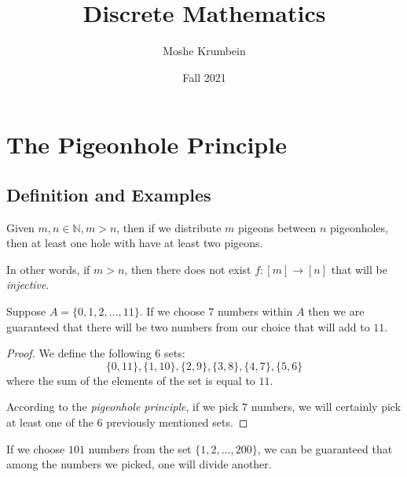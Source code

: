 \documentclass[00_complete]{subfiles}
\title{Discrete Mathematics}
\author{Moshe Krumbein}
\date{Fall 2021}
\begin{document}

\section{The Pigeonhole Principle}
\subsection{Definition and Examples}
\begin{definition}
    Given $m, n \in \mathbb{N}, m>n$, then if we distribute $m$ pigeons between
    $n$ pigeonholes, then at least one hole with have at least two pigeons.

    In other words, if $m>n$, then there does not exist $f: [m] \to [n]$ that
    will be \emph{injective}.
\end{definition}

\begin{claim}
    Suppose $A =\{0,1,2,\dots,11\}$. If we choose $7$ numbers within $A$ then
    we are guaranteed that there will be two numbers from our choice that will
    add to $11$.
\end{claim}

\begin{proof}
    We define the following $6$ sets:
    $$\{0,11\},\{1,10\}, \{2,9\}, \{3,8\}, \{4,7\}, \{5,6\}$$
    where the sum of the elements of the set is equal to $11$.

    According to the \emph{pigeonhole principle}, if we pick $7$ numbers, we
    will certainly pick at least one of the $6$ previously mentioned sets.
\end{proof}

\begin{claim}
    If we choose $101$ numbers from the set $\{1,2,\dots,200\}$, we can be
    guaranteed that among the numbers we picked, one will divide
    another.
\end{claim}
\end{document}

